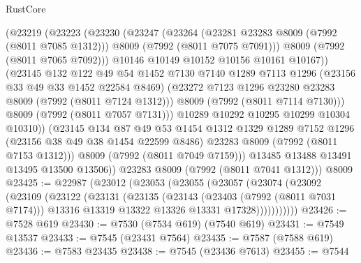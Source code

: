 \begin{lexlean}{RustCore}
\begin{coremodule}
                (@23219
                  (@23223
                    (@23230
                      (@23247
                        (@23264
                          (@23281 @23283 @8009 (@7992 (@8011 @7085 @1312)))
                          @8009
                          (@7992 (@8011 @7075 @7091)))
                        @8009
                        (@7992 (@8011 @7065 @7092)))
                      @10146
                      @10149
                      @10152
                      @10156
                      @10161
                      @10167))
                  (@23145
                    @132
                    @122
                    @49
                    @54
                    @1452
                    @7130
                    @7140
                    @1289
                    @7113
                    @1296
                    (@23156 @33 @49 @33 @1452 @22584 @8469)
                    (@23272 @7123 @1296 @23280 @23283 @8009 (@7992 (@8011 @7124 @1312)))
                    @8009
                    (@7992 (@8011 @7114 @7130)))
                  @8009
                  (@7992 (@8011 @7057 @7131)))
                @10289
                @10292
                @10295
                @10299
                @10304
                @10310))
            (@23145
              @134
              @87
              @49
              @53
              @1454
              @1312
              @1329
              @1289
              @7152
              @1296
              (@23156 @38 @49 @38 @1454 @22599 @8486)
              @23283
              @8009
              (@7992 (@8011 @7153 @1312)))
            @8009
            (@7992 (@8011 @7049 @7159)))
          @13485
          @13488
          @13491
          @13495
          @13500
          @13506))
      @23283
      @8009
      (@7992 (@8011 @7041 @1312)))
    @8009
@23425 := @22987
    (@23012
      (@23053
        (@23055
          (@23057
            (@23074
              (@23092
                (@23109
                  (@23122
                    (@23131
                      (@23135
                        (@23143
                          (@23403 (@7992 (@8011 @7031 @7174)))
                          @13316
                          @13319
                          @13322
                          @13326
                          @13331
                          @17328)))))))))))
@23426 := @7528 @619
@23430 := @7530 (@7534 @619) (@7540 @619)
@23431 := @7549 @13537
@23433 := @7545 (@23431 @7564)
@23435 := @7587 (@7588 @619)
@23436 := @7583 @23435
@23438 := @7545 (@23436 @7613)
@23455 := @7544

\end{coremodule}
\end{lexlean}
